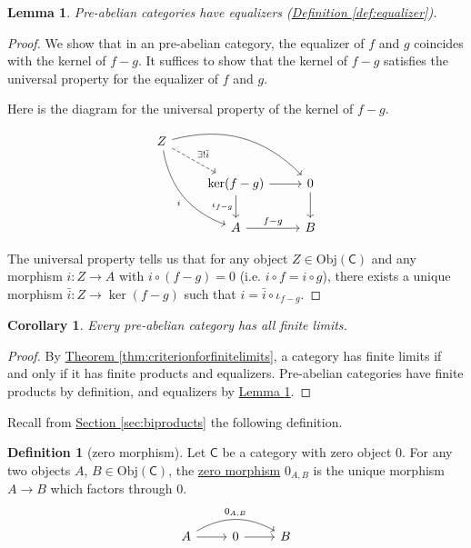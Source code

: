 \documentclass[a4paper,10pt]{scrreprt}
\newcommand{\defn}[1]{\ul{#1}}
\newcommand{\Obj}{\mathrm{Obj}}
\theoremstyle{definition}
\newtheorem{definition}{Definition}[section]
\theoremstyle{plain}
\newtheorem{lemma}{Lemma}[section]
\newtheorem{corollary}{Corollary}[section]
\theoremstyle{remark}
\begin{document}
\begin{lemma}
  \label{lemma:preabeliancategorieshaveequalizers}
  Pre-abelian categories have equalizers (\hyperref[def:equalizer]{Definition \ref*{def:equalizer}}).
\end{lemma}
\begin{proof}
  We show that in an pre-abelian category, the equalizer of $f$ and $g$ coincides with the kernel of $f - g$. It suffices to show that the kernel of $f - g$ satisfies the universal property for the equalizer of $f$ and $g$.

  Here is the diagram for the universal property of the kernel of $f - g$.
  \begin{equation*}
    \begin{tikzcd}
      Z
      \arrow[rrd, bend left]
      \arrow[ddr, bend right, swap, "i"]
      \arrow[dr, dashed, "\exists!\bar{i}"]
      \\
      & \ker(f - g)
      \arrow[d, swap, "\iota_{f - g}"]
      \arrow[r]
      & 0
      \arrow[d]
      \\
      & A
      \arrow[r, "f - g"]
      & B
    \end{tikzcd}
  \end{equation*}

  The universal property tells us that for any object $Z \in \Obj(\mathsf{C})$ and any morphism $i\colon Z \to A$ with $i \circ (f - g) = 0$ (i.e. $i \circ f = i \circ g$), there exists a unique morphism $\bar{i}\colon Z \to \ker(f - g)$ such that $i = \bar{i} \circ \iota_{f - g}$.
\end{proof}

\begin{corollary}
  Every pre-abelian category has all finite limits.
\end{corollary}
\begin{proof}
  By \hyperref[thm:criterionforfinitelimits]{Theorem \ref*{thm:criterionforfinitelimits}}, a category has finite limits if and only if it has finite products and equalizers. Pre-abelian categories have finite products by definition, and equalizers by \hyperref[lemma:preabeliancategorieshaveequalizers]{Lemma \ref*{lemma:preabeliancategorieshaveequalizers}}.
\end{proof}

Recall from \hyperref[sec:biproducts]{Section \ref*{sec:biproducts}} the following definition.

\begin{definition}[zero morphism]
  \label{def:zeromorphism}
  Let $\mathsf{C}$ be a category with zero object $0$. For any two objects $A$, $B \in \Obj(\mathsf{C})$, the \defn{zero morphism} $0_{A,B}$ is the unique morphism $A \to B$ which factors through $0$.
  \begin{equation*}
    \begin{tikzcd}
      A
      \arrow[rr, bend left, "0_{A, B}"]
      \arrow[r]
      & 0
      \arrow[r]
      & B
    \end{tikzcd}
  \end{equation*}
\end{definition}
\end{document}
